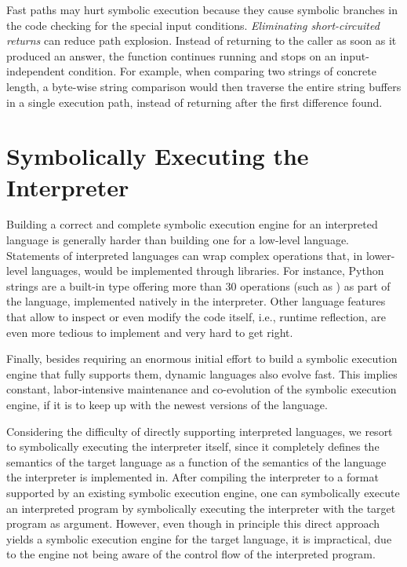 Fast paths may hurt symbolic execution because they cause symbolic branches in the code checking for the special input conditions.  \emph{Eliminating short-circuited returns} can reduce path explosion.  Instead of returning to the caller as soon as it produced an answer, the function continues running and stops on an input-independent condition.  For example, when comparing two strings of concrete length, a byte-wise string comparison would then traverse the entire string buffers in a single execution path, instead of returning after the first difference found.


\iffalse
\section{Symbolically Executing the Interpreter}

Building a correct and complete symbolic execution engine for an interpreted language is generally harder than building one for a low-level language. 
%
Statements of interpreted languages can wrap complex operations that, in lower-level languages, would be implemented through libraries. For instance, Python strings are a built-in type offering more than 30 operations (such as ) as part of the language, implemented natively in the interpreter. 
%
Other language features that allow to inspect or even modify the code itself, i.e., runtime reflection, are even more tedious to implement and very hard to get right.

Finally, besides requiring an enormous initial effort to build a symbolic execution engine that fully supports them, dynamic languages also evolve fast. This implies constant, labor-intensive maintenance and co-evolution of the symbolic execution engine, if it is to keep up with the newest versions of the language.

Considering the difficulty of directly supporting interpreted languages, we resort to symbolically executing the interpreter itself, since it completely defines the semantics of the target language as a function of the semantics of the language the interpreter is implemented in.
%
After compiling the interpreter to a format supported by an existing symbolic execution engine, one can symbolically execute an interpreted program by symbolically executing the interpreter with the target program as argument.
%
However, even though in principle this direct approach yields a symbolic execution engine for the target language, it is impractical, due to the engine not being aware of the control flow of the interpreted program.

